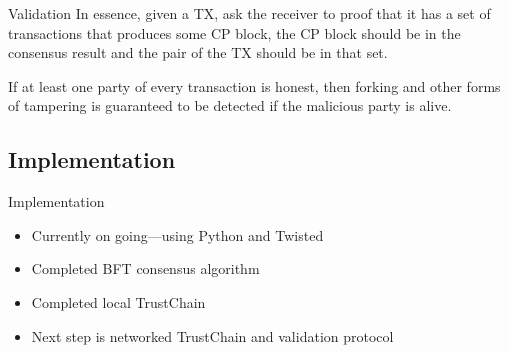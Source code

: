 \documentclass{beamer}
\begin{document}
\begin{frame}{Validation}
  In essence, given a TX, ask the receiver to proof that it has a set of
  transactions that produces some CP block, the CP block should be in the
  consensus result and the pair of the TX should be in that set.

  \begin{theorem}
    If at least one party of every transaction is honest, then forking and other
    forms of tampering is guaranteed to be detected if the malicious party is
    alive.
  \end{theorem}
\end{frame}

\subsection{Implementation}
\begin{frame}{Implementation}
  \begin{itemize}
    \item Currently on going---using Python and Twisted
    \item Completed BFT consensus algorithm
    \item Completed local TrustChain
    \item Next step is networked TrustChain and validation protocol
  \end{itemize}
\end{frame}
\end{document}
